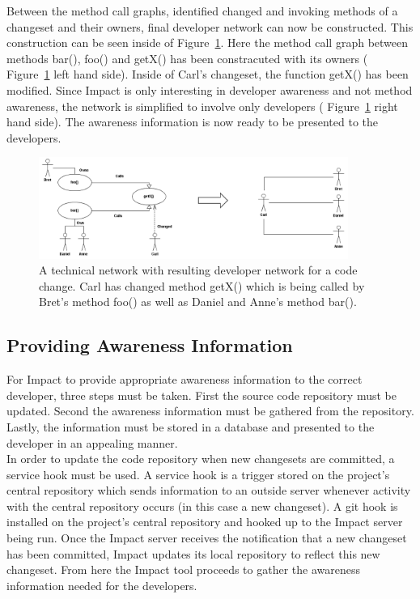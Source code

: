 \documentclass[conference]{IEEEtran}
\begin{document}
Between the method call graphs, identified changed and invoking methods of a changeset and their owners,
final developer network can now be constructed. This construction can be seen inside of Figure~\ref{fig:network}.
Here the method call graph between methods bar(), foo() and getX() has been constracuted with its owners
( Figure~\ref{fig:network} left hand side).
Inside of Carl's changeset, the function getX() has been modified. Since Impact is only interesting in developer
awareness and not method awareness, the network is simplified to involve only developers
( Figure~\ref{fig:network} right hand side). The awareness information is now ready to be presented to the
developers. \\

\begin{figure}[tb!]
\centering
\includegraphics[width=0.9\textwidth]{images/TecNetwork}
\caption{A technical network with resulting developer network for a code change. Carl has changed method getX() which is being
called by Bret's method foo() as well as Daniel and Anne's method bar().\label{fig:network}}
\end{figure}

\subsection{Providing Awareness Information}
For Impact to provide appropriate awareness information to the correct developer, three steps must be taken.
First the source code repository must be updated. Second the awareness information must be gathered from 
the repository. Lastly, the information must be stored in a database and presented to the developer in an 
appealing manner. \\

In order to update the code repository when new changesets are committed, a service hook must be used.
A service hook is a trigger stored on the project's central repository which sends information to an outside
server whenever activity with the central repository occurs (in this case a new changeset). A git hook is installed
on the project's central repository and hooked up to the Impact server being run. Once the Impact server 
receives the notification that a new changeset has been committed, Impact updates its local repository to
reflect this new changeset. From here the Impact tool proceeds to gather the awareness information needed
for the developers. \\
\end{document}
